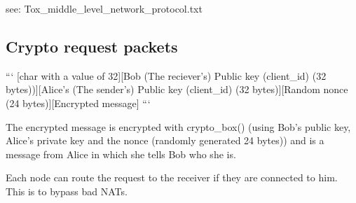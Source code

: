 see\+: Tox\+\_\+middle\+\_\+level\+\_\+network\+\_\+protocol.\+txt

\subsection*{Crypto request packets }

``` \mbox{[}char with a value of 32\mbox{]}\mbox{[}Bob (The reciever's) Public key (client\+\_\+id) (32 bytes))\mbox{]}\mbox{[}Alice's (The sender's) Public key (client\+\_\+id) (32 bytes)\mbox{]}\mbox{[}Random nonce (24 bytes)\mbox{]}\mbox{[}Encrypted message\mbox{]} ```

The encrypted message is encrypted with crypto\+\_\+box() (using Bob's public key, Alice's private key and the nonce (randomly generated 24 bytes)) and is a message from Alice in which she tells Bob who she is.

Each node can route the request to the receiver if they are connected to him. This is to bypass bad N\+A\+Ts. 
